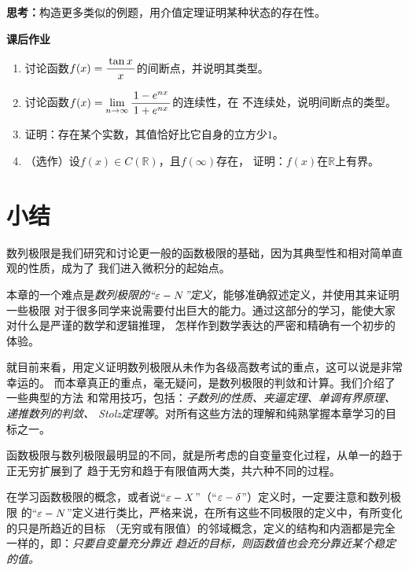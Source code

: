 {\bf 思考：}构造更多类似的例题，用介值定理证明某种状态的存在性。

\begin{ext}
	{\centering\bf 课后作业}
	
	\begin{enumerate}  
	  \item 讨论函数$f(x)=\displaystyle\frac{\,{\tan x}\,}{\,{x}\,}$的间断点，并说明其类型。
	  \item 讨论函数$f(x)=\lim\limits_{n\to\infty}\displaystyle\frac{\,{1-e^{nx}}\,}{\,{1+e^{nx}}\,}$的连续性，在
	  不连续处，说明间断点的类型。
	  \item 证明：存在某个实数，其值恰好比它自身的立方少$1$。
	  \item （选作）设$f(x)\in C(\mathbb{R})$，且$f(\infty)$存在，
	  证明：$f(x)$在$\mathbb{R}$上有界。
	\end{enumerate}
\end{ext}

\section*{小结}

数列极限是我们研究和讨论更一般的函数极限的基础，因为其典型性和相对简单直观的性质，成为了
我们进入微积分的起始点。

本章的一个难点是{\it 数列极限的“$\varepsilon-N$”定义}，能够准确叙述定义，并使用其来证明一些极限
对于很多同学来说需要付出巨大的能力。通过这部分的学习，能使大家对什么是严谨的数学和逻辑推理，
怎样作到数学表达的严密和精确有一个初步的体验。

就目前来看，用定义证明数列极限从未作为各级高数考试的重点，这可以说是非常幸运的。
而本章真正的重点，毫无疑问，是数列极限的判敛和计算。我们介绍了一些典型的方法
和常用技巧，包括：{\it 子数列的性质、夹逼定理、单调有界原理、递推数列的判敛、
Stolz定理等}。对所有这些方法的理解和纯熟掌握本章学习的目标之一。

函数极限与数列极限最明显的不同，就是所考虑的自变量变化过程，从单一的趋于正无穷扩展到了
趋于无穷和趋于有限值两大类，共六种不同的过程。

在学习函数极限的概念，或者说“$\varepsilon-X$”（“$\varepsilon-\delta$”）定义时，一定要注意和数列极限
的“$\varepsilon-N$”定义进行类比，严格来说，在所有这些不同极限的定义中，有所变化的只是所趋近的目标
（无穷或有限值）的邻域概念，定义的结构和内涵都是完全一样的，即：{\it 只要自变量充分靠近
趋近的目标，则函数值也会充分靠近某个稳定的值。}

